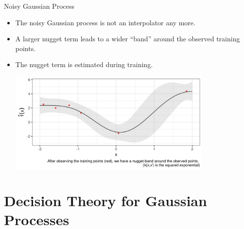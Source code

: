 \begin{vbframe}{Noisy Gaussian Process}
\begin{itemize}
\framebreak 

\item The noisy Gaussian process is not an interpolator any more.
\item A larger nugget term leads to a wider ``band'' around the observed training points.
\item The nugget term is estimated during training.


\begin{center}
    \includegraphics[width=0.8\textwidth]{figure_man/gp-regression.png}
\end{center}
\end{itemize}

\end{vbframe}



\section{Decision Theory for Gaussian Processes}

